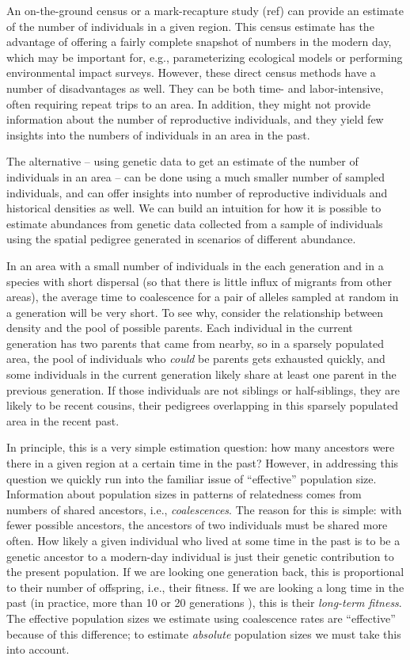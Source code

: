\documentclass{ar-1col}
\begin{document}
An on-the-ground census or a mark-recapture study (ref)
can provide an estimate of the number of individuals in a given region.
This census estimate has the advantage of offering a fairly complete
snapshot of numbers in the modern day,
which may be important for, e.g.,
parameterizing ecological models
or performing environmental impact surveys.
However, these direct census methods have a number of disadvantages as well.
They can be both time- and labor-intensive,
often requiring repeat trips to an area.
In addition, they might not provide information
about the number of reproductive individuals,
and they yield few insights into the numbers of individuals
in an area in the past.

The alternative --
using genetic data to get an estimate of the number of individuals in an area --
can be done using a much smaller number of sampled individuals,
and can offer insights into number of reproductive individuals and historical densities as well.
We can build an intuition for how it is possible to estimate
abundances from genetic data collected from a sample of individuals
using the spatial pedigree generated in scenarios of different abundance.

In an area with a small number of individuals in the each generation
and in a species with short dispersal
(so that there is little influx of migrants from other areas),
the average time to coalescence for a pair of alleles sampled
at random in a generation will be very short.
To see why, consider the relationship between density
and the pool of possible parents.
Each individual in the current generation has two parents that came from nearby,
so in a sparsely populated area,
the pool of individuals who \emph{could} be parents gets exhausted quickly,
and some individuals in the current generation
likely share at least one parent in the previous generation.
If those individuals are not siblings or half-siblings,
they are likely to be recent cousins,
their pedigrees overlapping in this sparsely populated area
in the recent past.

In principle, this is a very simple estimation question:
how many ancestors were there in a given region at a certain time in the past?
However, in addressing this question we quickly run into the familiar
issue of ``effective'' population size.
Information about population sizes in patterns of relatedness
comes from numbers of shared ancestors, i.e., \emph{coalescences}.
The reason for this is simple:
with fewer possible ancestors, the ancestors of two individuals
must be shared more often.
How likely a given individual who lived at some time in the past
is to be a genetic ancestor to a modern-day individual
is just their genetic contribution to the present population.
If we are looking one generation back, this is proportional to their
number of offspring, i.e., their fitness.
If we are looking a long time in the past
(in practice, more than 10 or 20 generations \citep{bartonfitness}),
this is their \emph{long-term fitness}.
The effective population sizes we estimate using coalescence rates
are ``effective'' because of this difference;
to estimate \emph{absolute} population sizes we must take this into account.
\end{document}
